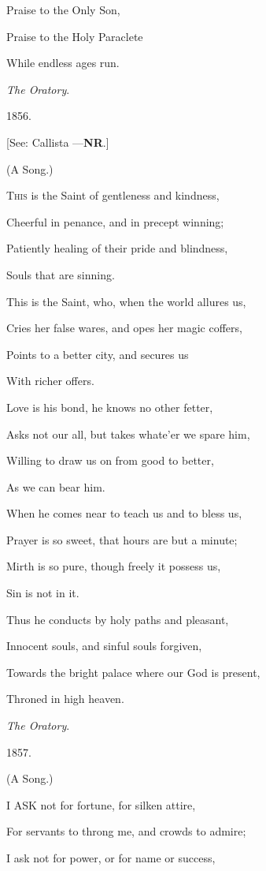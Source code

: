 Praise to the Only Son,

Praise to the Holy Paraclete

While endless ages run.

\emph{The Oratory}.

1856.

[See: Callista
—\textbf{NR}.]


(A Song.)

T\textsc{his} is the Saint of gentleness and kindness,

Cheerful in penance, and in precept winning;

Patiently healing of their pride and blindness,

Souls that are sinning.

This is the Saint, who, when the world allures us,

Cries her false wares, and opes her magic
coffers,

Points to a better city, and secures us

With richer offers.

Love is his bond, he knows no other fetter,

Asks not our all, but takes whate'er we
spare him,

Willing to draw us on from good to better,

As we can bear him.

When he comes near to teach us and to bless us,

Prayer is so sweet, that hours are but a
minute;

Mirth is so pure, though freely it possess us,

Sin is not in it. 

Thus he conducts by holy paths and pleasant,

Innocent souls, and sinful souls forgiven,

Towards the bright palace where our God is present,

Throned in high heaven.

\emph{The Oratory}.

1857.


(A Song.)

I ASK not for fortune, for silken attire,

For servants to throng me, and crowds to admire;

I ask not for power, or for name or success,

